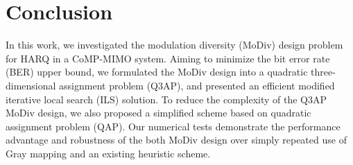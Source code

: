 \documentclass[journal,draftcls,onecolumn,12pt,twoside]{IEEEtran}
\begin{document}
\section{Conclusion}
\label{sec:conclusion}
In this work, we investigated the modulation diversity (MoDiv) design problem
for HARQ in a CoMP-MIMO system. Aiming to minimize the bit error rate (BER)
upper bound, we formulated the MoDiv design into a quadratic three-dimensional
assignment problem (Q3AP), and presented an efficient modified iterative local
search (ILS) solution. To reduce the complexity of the Q3AP MoDiv design, we
also proposed a simplified scheme based on quadratic assignment problem
(QAP). Our numerical tests demonstrate the performance advantage and robustness
of the both MoDiv design over simply repeated use of Gray mapping and an
existing heuristic scheme.
%
%

\end{document}

